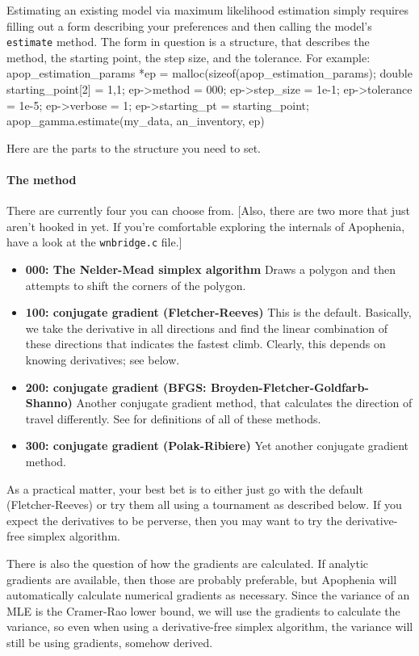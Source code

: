 Estimating an existing model via maximum likelihood estimation simply requires 
filling out a form describing your preferences and then calling the model's {\tt estimate} method.
The form in question is a  structure, that
describes the method, the starting point, the step size, and the
tolerance.
For example:
apop_estimation_params *ep  = malloc(sizeof(apop_estimation_params);
double  starting_point[2]   = {1,1};
ep->method      = 000;
ep->step_size   = 1e-1;
ep->tolerance   = 1e-5;
ep->verbose     = 1;
ep->starting_pt = starting_point;
apop_gamma.estimate(my_data, an_inventory, ep)

Here are the parts to the  
structure you need to set. 

\paragraph{The method} There are currently four you can choose from.
[Also, there are two more that  just aren't hooked in yet. If you're
comfortable exploring the internals of Apophenia, have a look at the
{\tt wnbridge.c} file.]


\begin{itemize}
\item {\bf 000: The Nelder-Mead simplex algorithm} Draws a polygon and then attempts to shift the corners of the polygon.
\item {\bf 100: conjugate gradient (Fletcher-Reeves)} This is the
default. Basically, we take the derivative in all directions and find
the linear combination of these directions that indicates the fastest
climb. Clearly, this depends on knowing derivatives; see below.
\item {\bf 200: conjugate gradient (BFGS: Broyden-Fletcher-Goldfarb-Shanno)}  Another conjugate gradient method, that calculates the direction of travel differently. See \cite{avriel:nonlinear} for definitions of all of these methods.
\item {\bf 300: conjugate gradient (Polak-Ribiere)} Yet another conjugate gradient method.
\end{itemize}

As a practical matter, your best bet is to either just go with the default (Fletcher-Reeves) or try them all using a tournament as described below. 
If you expect the derivatives to be perverse, then you may want to try the derivative-free simplex algorithm.

There is also the question of how the gradients are calculated. If
analytic gradients are available, then those are probably preferable, but
Apophenia will automatically calculate numerical gradients as necessary.
Since the variance of an MLE is the Cramer-Rao lower bound, we will use
the gradients to calculate the variance, so even when using a
derivative-free simplex algorithm, the variance will still be using
gradients, somehow derived.

